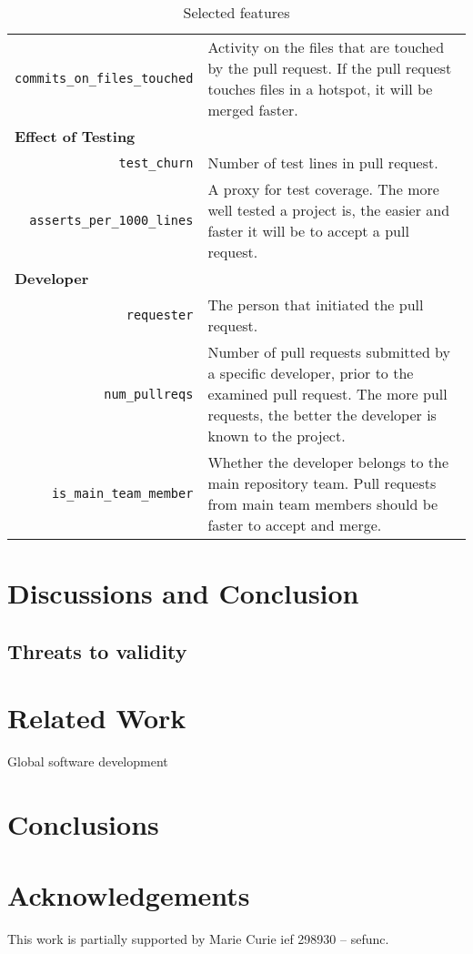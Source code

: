 \documentclass[conference]{IEEEtran}
\begin{document}
\begin{table*}
\begin{tabular}{rp{25em}}
    \texttt{commits\_on\_files\_touched} & Activity on the files that are
    touched by the pull request. If the pull request touches files in a hotspot,
    it will be merged faster.\\
    
    \multicolumn{2}{l}{\bf{Effect of Testing}}\\

    \texttt{test\_churn} & Number of test lines in pull request. \\

    \texttt{asserts\_per\_1000\_lines} & A proxy for test coverage. The
    more well tested a project is, the easier and faster it will be to accept 
    a pull request.\\
    
    \multicolumn{2}{l}{\bf{Developer}}\\
    
    \texttt{requester} & The person that initiated the pull request.\\

    \texttt{num\_pullreqs} & Number of pull requests submitted by a specific
    developer, prior to the examined pull request. The more pull requests, the
    better the developer is known to the project.\\

    \texttt{is\_main\_team\_member} & Whether the developer belongs to the
    main repository team. Pull requests from main team members should be
    faster to accept and merge.\\
    \hline
  \end{tabular}
  \caption{Selected features}
  \label{tab:features}
\end{table*}

\section{Discussions and Conclusion}

\subsection{Threats to validity}

\section{Related Work}

\cite{Bird09}
\cite{Cornf10}
\cite{Dabbi12}
\cite{Bird12}
\cite{Barr12}
\cite{Buffe99}
\cite{Mens02}
\cite{Shiha12}

Global software development
\section{Conclusions}

\section*{Acknowledgements}
This work is partially supported by Marie Curie {\sc ief} 298930 -- {\sc sefunc}.



\end{document}
